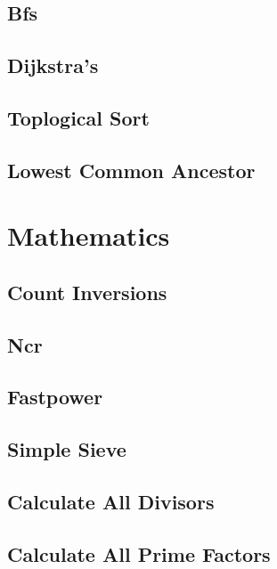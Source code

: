 \subsection{Bfs}
\raggedbottom
\hrulefill
\subsection{Dijkstra's}
\raggedbottom
\hrulefill
\subsection{Toplogical Sort}
\raggedbottom
\hrulefill
\subsection{Lowest Common Ancestor}
\raggedbottom
\hrulefill

\section{Mathematics}
\subsection{Count Inversions}
\raggedbottom
\hrulefill
\subsection{Ncr}
\raggedbottom
\hrulefill
\subsection{Fastpower}
\raggedbottom
\hrulefill
\subsection{Simple Sieve}
\raggedbottom
\hrulefill
\subsection{Calculate All Divisors}
\raggedbottom
\hrulefill
\subsection{Calculate All Prime Factors}
\raggedbottom
\hrulefill
